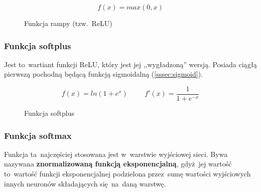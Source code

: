 \begin{equation}
	f(x) = max(0,x)
\end{equation}
\begin{figure}[H]
    \centering
    \caption{Funkcja rampy (tzw.~ReLU)}
\end{figure}

\subsubsection{Funkcja softplus}
Jest to~wartiant funkcji ReLU, który jest jej ,,wygładzoną'' wersją. Posiada ciągłą pierwszą pochodną będącą funkcją
sigmoidalną (\ref{sssec:sigmoid}).

\begin{equation}
	f(x) = ln(1 + e^x)  \hspace{1cm} f'(x) = \frac{1}{1 + e^{-x}}
\end{equation}
\begin{figure}[H]
    \centering
    \caption{Funkcja softplus}
\end{figure}

\subsubsection{Funkcja softmax}
Funkcja ta~najczęściej stosowana jest w~warstwie wyjściowej sieci. Bywa nazywana \textbf{znormalizowaną funkcją
eksponencjalną}, gdyż~jej wartość to~wartość funkcji eksponencjalnej podzielona przez~sumę wartości wyjściowych innych
neuronów składających się~na~daną warstwę.

